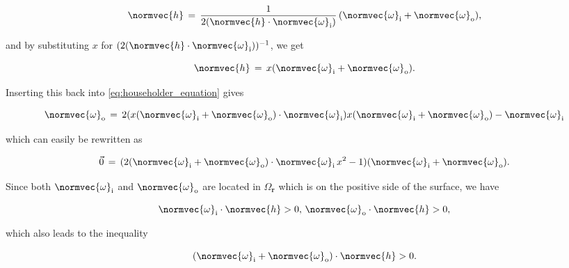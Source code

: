 \begin{equation}
\normvec{h} \,=\, \frac{1}{2(\normvec{h}\cdot\normvec{\omega}_{\text{i}})}\,(\normvec{\omega}_{\text{i}} + \normvec{\omega}_{\text{o}}),
\end{equation}

and by substituting $x$ for $(2(\normvec{h}\cdot\normvec{\omega}_{\text{i}}))^{-1}$, we get

\begin{equation} \label{eq:householder_equation_x_introduced}
\normvec{h} \,=\, x(\normvec{\omega}_{\text{i}} + \normvec{\omega}_{\text{o}}).
\end{equation}

Inserting this back into \eqref{eq:householder_equation} gives

\begin{equation}
\normvec{\omega}_{\text{o}} \,=\, 2(x(\normvec{\omega}_{\text{i}} + \normvec{\omega}_{\text{o}})\cdot\normvec{\omega}_{\text{i}})x(\normvec{\omega}_{\text{i}} + \normvec{\omega}_{\text{o}}) - \normvec{\omega}_{\text{i}}
\end{equation}

which can easily be rewritten as

\begin{equation} \label{eq:householder_x_second_order_with_vectors}
\vec{0} \,=\, (2(\normvec{\omega}_{\text{i}} + \normvec{\omega}_{\text{o}})\cdot\normvec{\omega}_{\text{i}}\,x^2 - 1)(\normvec{\omega}_{\text{i}} + \normvec{\omega}_{\text{o}}).
\end{equation}

Since both $\normvec{\omega}_{\text{i}}$ and $\normvec{\omega}_{\text{o}}$ are located in $\Omega_{\textbf{r}}$ which is on the positive side of the surface, we have

\begin{equation} \label{eq:reflection_direction_and_direction_against_light_source_on_positive_side_of_surface_separate}
\normvec{\omega}_{\text{i}}\cdot\normvec{h} > 0,\, \normvec{\omega}_{\text{o}}\cdot\normvec{h} > 0,
\end{equation}

which also leads to the inequality

\begin{equation} \label{eq:reflection_direction_and_direction_against_light_source_on_positive_side_of_surface_together}
(\normvec{\omega}_{\text{i}} + \normvec{\omega}_{\text{o}})\cdot\normvec{h} > 0.
\end{equation}

